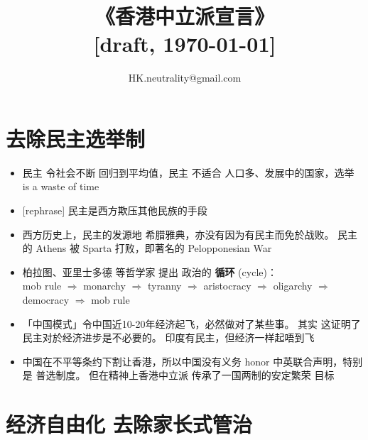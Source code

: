 

\usepackage[backend=biber]{biblatex}


\usepackage[CJKspace]{xeCJK}

\title{《香港中立派宣言》\\{\footnotesize\color{red}[draft, \today]} }
\author{HK.neutrality@gmail.com}
\date{}

\setcounter{secnumdepth}{0}		%
\renewcommand{\familydefault}{\sfdefault}


\maketitle
\Large

\section{去除民主选举制}

\begin{itemize}
	\item 民主 令社会不断 回归到平均值，民主 不适合 人口多、发展中的国家，选举 is a waste of time

	\item {\color{red}[rephrase]} 民主是西方欺压其他民族的手段

	\item 西方历史上，民主的发源地 希腊雅典，亦没有因为有民主而免於战败。 民主的 Athens 被 Sparta 打败，即著名的 Pelopponesian War

	\item 柏拉图、亚里士多德 等哲学家 提出 政治的 \textbf{循环} (cycle)： \\
		mob rule $\Rightarrow$ monarchy $\Rightarrow$ tyranny $\Rightarrow$ aristocracy $\Rightarrow$ oligarchy $\Rightarrow$ democracy $\Rightarrow$ mob rule 

	\item 「中国模式」令中国近10-20年经济起飞，必然做对了某些事。 其实 这证明了民主对於经济进步是不必要的。 印度有民主，但经济一样起唔到飞
	
	\item 中国在不平等条约下割让香港，所以中国没有义务 honor 中英联合声明，特别是 普选制度。 但在精神上香港中立派 传承了一国两制的安定繁荣 目标
	
\end{itemize}

\section{经济自由化 \textbullet 去除家长式管治}

